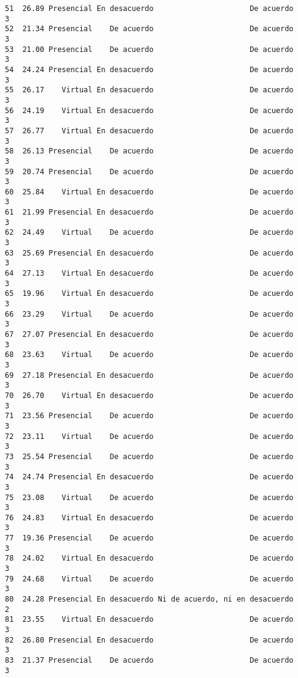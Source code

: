 \documentclass[
  letterpaper,
  DIV=11,
  numbers=noendperiod]{scrartcl}
\begin{document}
\begin{verbatim}
51  26.89 Presencial En desacuerdo                      De acuerdo           3
52  21.34 Presencial    De acuerdo                      De acuerdo           3
53  21.00 Presencial    De acuerdo                      De acuerdo           3
54  24.24 Presencial En desacuerdo                      De acuerdo           3
55  26.17    Virtual En desacuerdo                      De acuerdo           3
56  24.19    Virtual En desacuerdo                      De acuerdo           3
57  26.77    Virtual En desacuerdo                      De acuerdo           3
58  26.13 Presencial    De acuerdo                      De acuerdo           3
59  20.74 Presencial    De acuerdo                      De acuerdo           3
60  25.84    Virtual En desacuerdo                      De acuerdo           3
61  21.99 Presencial En desacuerdo                      De acuerdo           3
62  24.49    Virtual    De acuerdo                      De acuerdo           3
63  25.69 Presencial En desacuerdo                      De acuerdo           3
64  27.13    Virtual En desacuerdo                      De acuerdo           3
65  19.96    Virtual En desacuerdo                      De acuerdo           3
66  23.29    Virtual    De acuerdo                      De acuerdo           3
67  27.07 Presencial En desacuerdo                      De acuerdo           3
68  23.63    Virtual    De acuerdo                      De acuerdo           3
69  27.18 Presencial En desacuerdo                      De acuerdo           3
70  26.70    Virtual En desacuerdo                      De acuerdo           3
71  23.56 Presencial    De acuerdo                      De acuerdo           3
72  23.11    Virtual    De acuerdo                      De acuerdo           3
73  25.54 Presencial    De acuerdo                      De acuerdo           3
74  24.74 Presencial En desacuerdo                      De acuerdo           3
75  23.08    Virtual    De acuerdo                      De acuerdo           3
76  24.83    Virtual En desacuerdo                      De acuerdo           3
77  19.36 Presencial    De acuerdo                      De acuerdo           3
78  24.02    Virtual En desacuerdo                      De acuerdo           3
79  24.68    Virtual    De acuerdo                      De acuerdo           3
80  24.28 Presencial En desacuerdo Ni de acuerdo, ni en desacuerdo           2
81  23.55    Virtual En desacuerdo                      De acuerdo           3
82  26.80 Presencial En desacuerdo                      De acuerdo           3
83  21.37 Presencial    De acuerdo                      De acuerdo           3

\end{verbatim}
\end{document}
